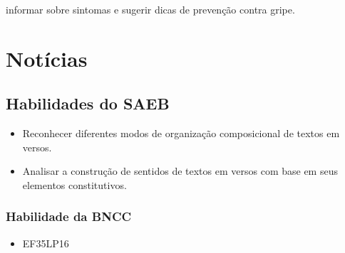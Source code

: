 \begin{conteudo}
\begin{conteudo}
\begin{conteudo}
\begin{conteudo}
\begin{escolha}
\item informar sobre sintomas e sugerir dicas de prevenção contra gripe.
\end{escolha}


\chapter{Notícias}


\section*{Habilidades do SAEB}

\begin{itemize}
  \item Reconhecer diferentes modos de organização composicional de textos em versos.

  \item Analisar a construção de sentidos de textos em versos com base em seus elementos constitutivos.
\end{itemize}



\subsection{Habilidade da BNCC}

\begin{itemize}
	\item 
 EF35LP16
\end{itemize}

\end{conteudo}
\end{conteudo}
\end{conteudo}
\end{conteudo}

